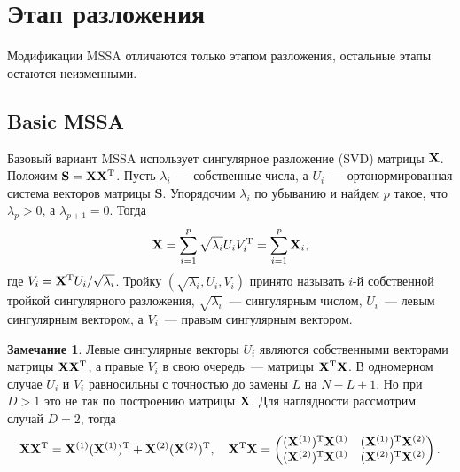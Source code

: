 \documentclass[specialist,
substylefile = spbu_report.rtx,
subf,href,colorlinks=true, 12pt]{disser}
\theoremstyle{definition}
\newtheorem{remark}{Замечание}
\begin{document}
\section{Этап разложения}\label{sect:decomposition}

Модификации MSSA отличаются только этапом разложения, остальные этапы остаются неизменными.
\subsection{Basic MSSA}\label{sect:basic_mssa}
Базовый вариант MSSA использует сингулярное разложение (SVD) матрицы $\mathbf{X}$. Положим $\mathbf{S}=\mathbf{X}\mathbf{X}^{\mathrm{T}}$. Пусть $\lambda_i$~--- собственные числа, а $U_i$~--- ортонормированная система векторов матрицы $\mathbf{S}$. Упорядочим $\lambda_i$ по убыванию и найдем $p$ такое, что $\lambda_p>0$, а $\lambda_{p+1}=0$. Тогда
\begin{equation}\label{eq:svd}
	\mathbf{X}=\sum_{i=1}^p\sqrt{\lambda_i}U_iV_i^{\mathrm{T}}=\sum_{i=1}^p\mathbf{X}_i,
\end{equation}
где $V_i=\mathbf{X}^{\mathrm{T}} U_i/\sqrt{\lambda_i}$. Тройку $(\sqrt{\lambda_i}, U_i, V_i)$ принято называть $i$-й собственной тройкой сингулярного разложения, $\sqrt{\lambda_i}$~--- сингулярным числом, $U_i$~--- левым сингулярным вектором, а $V_i$~--- правым сингулярным вектором.

\begin{remark}\label{remark:svd}
	Левые сингулярные векторы $U_i$ являются собственными векторами матрицы $\mathbf{X}\mathbf{X}^{\mathrm{T}}$, а правые $V_i$ в свою очередь~--- матрицы $\mathbf{X}^{\mathrm{T}}\mathbf{X}$. В одномерном случае $U_i$ и $V_i$ равносильны с точностью до замены $L$ на $N-L+1$. Но при $D>1$ это не так по построению матрицы $\mathbf{X}$. Для наглядности рассмотрим случай $D=2$, тогда
	\[
		\mathbf{X}\mathbf{X}^{\mathrm{T}}=\mathbf{X}^{(1)}(\mathbf{X}^{(1)})^{\mathrm{T}} + \mathbf{X}^{(2)}(\mathbf{X}^{(2)})^{\mathrm{T}},\quad
		\mathbf{X}^{\mathrm{T}}\mathbf{X}=
		\begin{pmatrix}
			(\mathbf{X}^{(1)})^{\mathrm{T}}\mathbf{X}^{(1)} & (\mathbf{X}^{(1)})^{\mathrm{T}}\mathbf{X}^{(2)} \\
			(\mathbf{X}^{(2)})^{\mathrm{T}}\mathbf{X}^{(1)} & (\mathbf{X}^{(2)})^{\mathrm{T}}\mathbf{X}^{(2)}
		\end{pmatrix}.
	\]
\end{remark}
\end{document}
